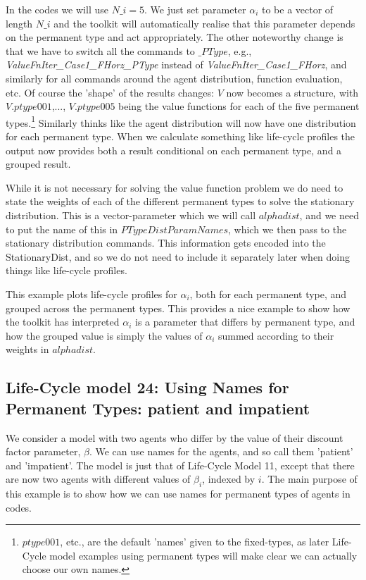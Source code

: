 In the codes we will use $N\_{}i=5$. We just set parameter $\alpha_i$ to be a vector of length $N\_{}i$ and the toolkit will automatically realise that this parameter depends on the permanent type and act appropriately. The other noteworthy change is that we have to switch all the commands to $\_{}PType$, e.g., \textit{ValueFnIter\_{}Case1\_{}FHorz\_{}PType} instead of \textit{ValueFnIter\_{}Case1\_{}FHorz}, and similarly for all commands around the agent distribution, function evaluation, etc. Of course the 'shape' of the results changes: $V$ now becomes a structure, with $V.ptype001$,..., $V.ptype005$ being the value functions for each of the five permanent types.\footnote{$ptype001$, etc., are the default 'names' given to the fixed-types, as later Life-Cycle model examples using permanent types will make clear we can actually choose our own names.} Similarly thinks like the agent distribution will now have one distribution for each permanent type. When we calculate something like life-cycle profiles the output now provides both a result conditional on each permanent type, and a grouped result.

While it is not necessary for solving the value function problem we do need to state the weights of each of the different permanent types to solve the stationary distribution. This is a vector-parameter which we will call $alphadist$, and we need to put the name of this in $PTypeDistParamNames$, which we then pass to the stationary distribution commands. This information gets encoded into the StationaryDist, and so we do not need to include it separately later when doing things like life-cycle profiles.

This example plots life-cycle profiles for $\alpha_i$, both for each permanent type, and grouped across the permanent types. This provides a nice example to show how the toolkit has interpreted $\alpha_i$ is a parameter that differs by permanent type, and how the grouped value is simply the values of $\alpha_i$ summed according to their weights in $alphadist$.


\subsection{Life-Cycle model 24: Using Names for Permanent Types: patient and impatient}
We consider a model with two agents who differ by the value of their discount factor parameter, $\beta$. We can use names for the agents, and so call them 'patient' and 'impatient'. The model is just that of Life-Cycle Model 11, except that there are now two agents with different values of $\beta_i$, indexed by $i$. The main purpose of this example is to show how we can use names for permanent types of agents in codes.

